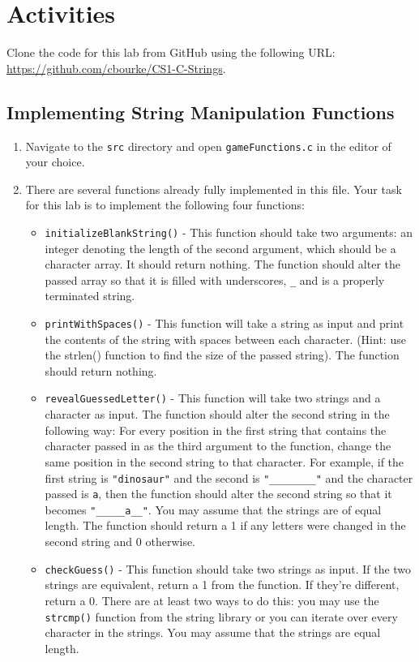 \documentclass[12pt]{scrartcl}
\begin{document}
\section{Activities}

Clone the code for this lab from GitHub using the following URL: 
\url{https://github.com/cbourke/CS1-C-Strings}.

\subsection{Implementing String Manipulation Functions}

\begin{enumerate}
  \item Navigate to the \texttt{src} directory and open 
  	\texttt{gameFunctions.c} in the editor of your choice.
  \item There are several functions already fully implemented in this file.  
	Your task for this lab is to implement the following four functions:
	\begin{itemize}
	  \item \texttt{initializeBlankString()} - This function should 
	  take two arguments: an integer denoting the length of the 
	  second argument, which should be a character array.  It should 
	  return nothing.   The function should alter the passed array so that 
	  it is filled with underscores, \texttt{_} and is a properly 
	  terminated string.
	  \item \texttt{printWithSpaces()} - This function will take a 
	  string as input and print the contents of the string with spaces 
	  between each character.  (Hint: use the strlen() function to find 
	  the size of the passed string).   The function should return nothing.
	  \item \texttt{revealGuessedLetter()} - This function will take 
	  two strings and a character as input.   The function should alter 
	  the second string in the following way: For every position in the 
	  first string that contains the character passed in as the third 
	  argument to the function, change the same position in the second 
	  string to that character.  For example, if the first string is 
	  \texttt{"dinosaur"} and the second is \texttt{"________"}
	  and the character passed is \texttt{a}, then the function 
	  should alter the second string so that it becomes \texttt{"_____a__"}.
	  You may assume that the strings are of equal length.   The function 
	  should return a 1 if any letters were changed in the second 
	  string and 0 otherwise.
	  \item \texttt{checkGuess()} - This function should take 
	  two strings as input.  If the two strings are equivalent, return a 
	  1 from the function.  If they're different, return a 0.  There are at 
	  least two ways to do this: you may use the \texttt{strcmp()} 
	  function from the string library or you can iterate over every character 
	  in the strings.  You may assume that the strings are equal length.
	\end{itemize}


\end{enumerate}
\end{document}
